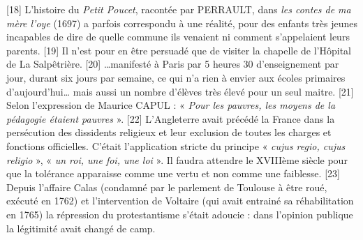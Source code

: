 [18] L'histoire du \emph{Petit Poucet}, racontée par PERRAULT, dans \emph{les contes de ma mère l'oye} (1697) a parfois correspondu à une réalité, pour des enfants très jeunes incapables de dire de quelle commune ils venaient ni comment s'appelaient leurs parents.
[19] Il n'est pour en être persuadé que de visiter la chapelle de l'Hôpital de La Salpêtrière.
[20] …manifesté à Paris par 5 heures 30 d'enseignement par jour, durant six jours par semaine, ce qui n'a rien à envier aux écoles primaires d'aujourd'hui… mais aussi un nombre d'élèves très élevé pour un seul maitre.
[21] Selon l'expression de Maurice CAPUL : « \emph{Pour les pauvres, les moyens de la pédagogie étaient pauvres} ».
[22] L'Angleterre avait précédé la France dans la persécution des dissidents religieux et leur exclusion de toutes les charges et fonctions officielles. C'était l'application stricte du principe « \emph{cujus regio, cujus religio} », « \emph{un roi, une foi, une loi} ». Il faudra attendre le XVIIIème siècle pour que la tolérance apparaisse comme une vertu et non comme une faiblesse. 
[23] Depuis l'affaire Calas (condamné par le parlement de Toulouse à être roué, exécuté en 1762) et l'intervention de Voltaire (qui avait entrainé sa réhabilitation en 1765) la répression du protestantisme s'était adoucie : dans l'opinion publique la légitimité avait changé de camp.